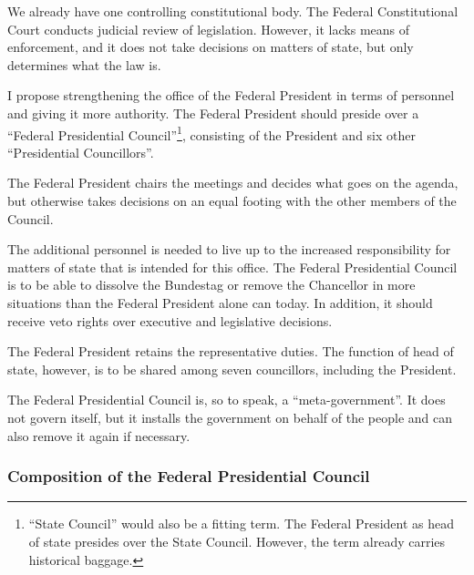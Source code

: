 We already have one controlling constitutional body.
The Federal Constitutional Court conducts judicial review of legislation.
However, it lacks means of enforcement, and it does not take decisions on matters of state, but only determines what the law is.

I propose strengthening the office of the Federal President in terms of personnel and giving it more authority.
The Federal President should preside over a \enquote{Federal Presidential Council}\footnote{\enquote{State Council} would also be a fitting term. The Federal President as head of state presides over the State Council.
However, the term already carries historical baggage.},
consisting of the President and six other \enquote{Presidential Councillors}.

The Federal President chairs the meetings and decides what goes on the agenda, but otherwise takes decisions on an equal footing with the other members of the Council.

The additional personnel is needed to live up to the increased responsibility for matters of state that is intended for this office.
The Federal Presidential Council is to be able to dissolve the Bundestag or remove the Chancellor in more situations than the Federal President alone can today.
In addition, it should receive veto rights over executive and legislative decisions.

The Federal President retains the representative duties.
The function of head of state, however, is to be shared among seven councillors, including the President.

The Federal Presidential Council is, so to speak, a \enquote{meta-government}.
It does not govern itself, but it installs the government on behalf of the people and can also remove it again if necessary.

\subsubsection{Composition of the Federal Presidential Council} \label{subsubsec:presidential_council_composition}

